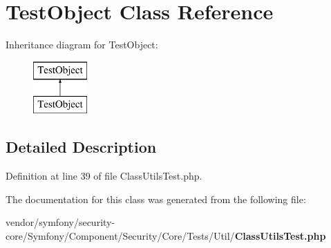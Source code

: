 \section{Test\+Object Class Reference}
\label{class_symfony_1_1_component_1_1_security_1_1_core_1_1_tests_1_1_util_1_1_test_object}
Inheritance diagram for Test\+Object\+:\begin{figure}[H]
\begin{center}
\leavevmode
\includegraphics[height=2.000000cm]{class_symfony_1_1_component_1_1_security_1_1_core_1_1_tests_1_1_util_1_1_test_object}
\end{center}
\end{figure}


\subsection{Detailed Description}


Definition at line 39 of file Class\+Utils\+Test.\+php.



The documentation for this class was generated from the following file\+:\begin{DoxyCompactItemize}
\item 
vendor/symfony/security-\/core/\+Symfony/\+Component/\+Security/\+Core/\+Tests/\+Util/{\bf Class\+Utils\+Test.\+php}\end{DoxyCompactItemize}
